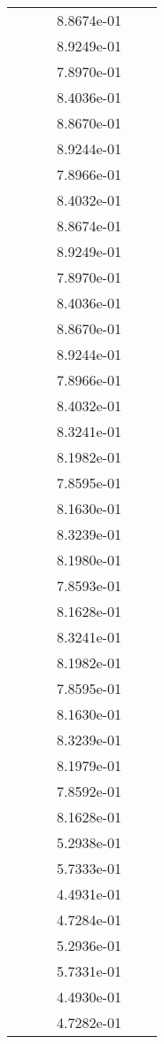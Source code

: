 \begin{xltabular}{\textwidth}{r|rS[table-format=1.3e+2]S[table-format=1.4e+2]S[table-format=1.4e+2]S[table-format=-1.5]}
&  &  & 8.8674e-01 & & \\
&  &  & 8.9249e-01 & & \\
&  &  & 7.8970e-01 & & \\
&  &  & 8.4036e-01 & & \\
&  &  & 8.8670e-01 & & \\
&  &  & 8.9244e-01 & & \\
&  &  & 7.8966e-01 & & \\
&  &  & 8.4032e-01 & & \\
&  &  & 8.8674e-01 & & \\
&  &  & 8.9249e-01 & & \\
&  &  & 7.8970e-01 & & \\
&  &  & 8.4036e-01 & & \\
&  &  & 8.8670e-01 & & \\
&  &  & 8.9244e-01 & & \\
&  &  & 7.8966e-01 & & \\
&  &  & 8.4032e-01 & & \\
&  &  & 8.3241e-01 & & \\
&  &  & 8.1982e-01 & & \\
&  &  & 7.8595e-01 & & \\
&  &  & 8.1630e-01 & & \\
&  &  & 8.3239e-01 & & \\
&  &  & 8.1980e-01 & & \\
&  &  & 7.8593e-01 & & \\
&  &  & 8.1628e-01 & & \\
&  &  & 8.3241e-01 & & \\
&  &  & 8.1982e-01 & & \\
&  &  & 7.8595e-01 & & \\
&  &  & 8.1630e-01 & & \\
&  &  & 8.3239e-01 & & \\
&  &  & 8.1979e-01 & & \\
&  &  & 7.8592e-01 & & \\
&  &  & 8.1628e-01 & & \\
&  &  & 5.2938e-01 & & \\
&  &  & 5.7333e-01 & & \\
&  &  & 4.4931e-01 & & \\
&  &  & 4.7284e-01 & & \\
&  &  & 5.2936e-01 & & \\
&  &  & 5.7331e-01 & & \\
&  &  & 4.4930e-01 & & \\
&  &  & 4.7282e-01 & & \\

\end{xltabular}
